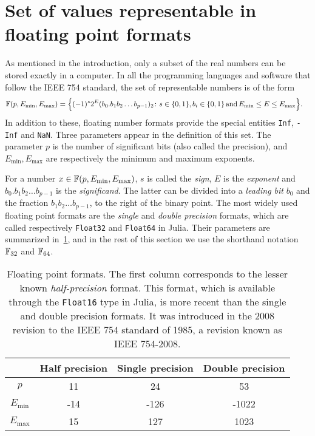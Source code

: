 \section{Set of values representable in floating point formats}%
\label{sec:set_of_values}
As mentioned in the introduction,
only a subset of the real numbers can be stored exactly in a computer.
In all the programming languages and software that follow the IEEE 754 standard,
the set of representable numbers is of the form
\begin{align*}
    \mathbb F (p, E_{\min}, E_{\max})
    &= \Bigl\{ (-1)^s 2^E (b_0. b_1 b_2 \dots b_{p-1})_2 \colon s \in \{0, 1\}, b_i \in \{0, 1\} \, \text{and} \, E_{\min} \leq E \leq E_{\max} \Bigr\}.
\end{align*}
In addition to these, floating number formats provide the special entities \texttt{Inf}, \texttt{-Inf} and \texttt{NaN}.
Three parameters appear in the definition of this set.
The parameter $p$ is the number of significant bits (also called the precision),
and $E_{\min}, E_{\max}$ are respectively the minimum and maximum exponents.

For a number $x \in \mathbb F(p, E_{\min}, E_{\max})$,
$s$ is called the \emph{sign}, $E$ is the \emph{exponent} and
$b_0. b_1 b_2 \dots b_{p-1}$ is the \emph{significand}.
The latter can be divided into a \emph{leading bit} $b_0$ and the fraction $b_1 b_2 \dots b_{p-1}$,
to the right of the binary point.
The most widely used floating point formats are the \emph{single} and \emph{double precision} formats,
which are called respectively \texttt{Float32} and \texttt{Float64} in Julia.
Their parameters are summarized in~\cref{table:floating_point_formats},
and in the rest of this section we use the shorthand notation $\mathbb F_{32}$ and $\mathbb F_{64}$.
\begin{table}[hb]
    \centering
    \begin{tabular}{|c|c|c|c|}
        \hline
        & Half precision & Single precision & Double precision
        \\ \hline
        $p$ & 11 & 24 & 53
        \\ \hline
        $E_{\min}$ & -14 & -126 & -1022
        \\ \hline
        $E_{\max}$ & 15 & 127 & 1023
        \\ \hline
    \end{tabular}
    \caption{%
        Floating point formats.
        The first column corresponds to the lesser known \emph{half-precision} format.
        This format,
        which is available through the \texttt{Float16} type in Julia,
        is more recent than the single and double precision formats.
        It was introduced in the 2008 revision to the IEEE 754 standard of 1985,
        a revision known as IEEE 754-2008.
    }%
    \label{table:floating_point_formats}
\end{table}


